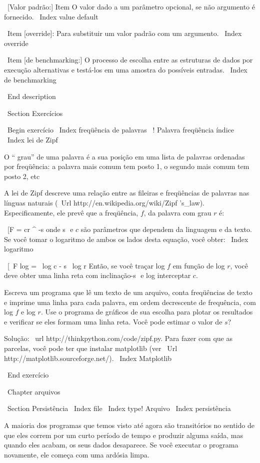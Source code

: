 \documentclass[10pt]{book}
\begin{document}
{{{{{{{{{{\ [Valor padrão:] Item O valor dado a um parâmetro opcional, se não
argumento é fornecido.
\ Index {value default}

\ Item [override]: Para substituir um valor padrão com um argumento.
\ Index {override}

\ Item [de benchmarking:] O processo de escolha entre as estruturas de dados
por execução alternativas e testá-los em uma amostra do
possíveis entradas.  
\ Index {} de benchmarking

\ End {description}


\ Section {Exercícios}

\ Begin {} exercício
\ Index {freqüência de palavras}
\ {! Palavra freqüência} índice
\ Index {lei de Zipf}

O `` grau'' de uma palavra é a sua posição em uma lista de palavras
ordenadas por freqüência: a palavra mais comum tem posto 1, o
segundo mais comum tem posto 2, etc

A lei de Zipf descreve uma relação entre as fileiras e freqüências
de palavras nas línguas naturais
(\ Url {http://en.wikipedia.org/wiki/Zipf 's_law}). Especificamente, ele
prevê que a freqüência, $ f $, da palavra com grau $ r $ é:

\ [F = cr ^ {-s} \]
%
onde s $ $ e $ c $ são parâmetros que dependem da linguagem e da
texto. Se você tomar o logaritmo de ambos os lados desta equação, você
obter:
\ Index {logaritmo}

\ [\ F log = \ log c - s \ log r \]
%
Então, se você traçar log $ f $ em função de log $ r $, você deve obter
uma linha reta com inclinação-s $ $ e log interceptar $ c $.

Escreva um programa que lê um texto de um arquivo, conta
freqüências de texto e imprime uma linha
para cada palavra, em ordem decrescente de frequência, com
log $ f $ e log $ r $. Use o programa de gráficos de sua
escolha para plotar os resultados e verificar se eles formam
uma linha reta. Você pode estimar o valor de $ s $?

Solução: \ url {http://thinkpython.com/code/zipf.py}. Para fazer com que as parcelas, você
pode ter que instalar matplotlib (ver
\ Url {http://matplotlib.sourceforge.net/}).
\ Index {} Matplotlib

\ End {} exercício


\ Chapter {arquivos}


\ Section {} Persistência
\ Index {file}
\ Index {type! Arquivo}
\ Index {persistência}

A maioria dos programas que temos visto até agora são transitórios no
sentido de que eles correm por um curto período de tempo e produzir alguma saída,
mas quando eles acabam, os seus dados desaparece. Se você executar o programa
novamente, ele começa com uma ardósia limpa.

}}}}}}}}}}
\end{document}
